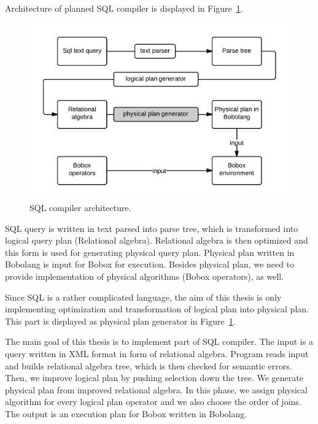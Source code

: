 Architecture of planned SQL compiler is displayed in Figure~\ref{fig:sqlarchitecture}. 
\begin{figure}[h!]
  \centering

    \includegraphics[width=1\textwidth]{sqlarchitecture}
    
      \caption{SQL compiler architecture.}
        \label{fig:sqlarchitecture}
\end{figure}
SQL query is written in text parsed into parse tree, which is transformed into logical query plan (Relational algebra). Relational algebra is then optimized and this form is used for generating physical query plan. Physical plan written in Bobolang is input for Bobox for execution. Besides physical plan, we need to provide implementation of physical algorithms (Bobox operators), as well.

Since SQL is a rather complicated language, the aim of this thesis is only implementing optimization and transformation of logical plan into physical plan. This part is displayed as physical plan generator in Figure~\ref{fig:sqlarchitecture}.


The main goal of this thesis is to implement part of SQL compiler. The input is a  query written in XML format in form of relational algebra. Program reads input and builds relational algebra tree, which is then checked for semantic errors. Then, we improve logical plan by pushing selection down the tree. We generate physical plan from improved relational algebra. In this phase, we assign physical algorithm for every logical plan operator and we also choose the order of joins. The output is an execution plan for Bobox written in Bobolang.

